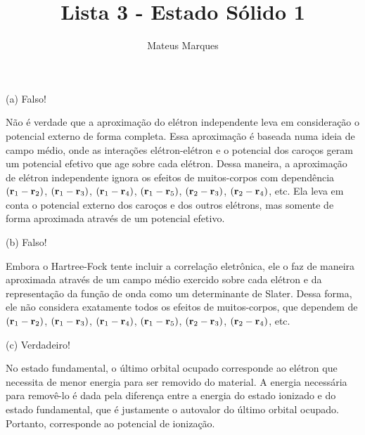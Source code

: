 \documentclass[a4paper,10pt]{article}
\title{\Huge{\textbf{Lista 3 - Estado Sólido 1}}}
\author{Mateus Marques}
\begin{document}
\maketitle

\section{}

(a) Falso!

\n

Não é verdade que a aproximação do elétron independente leva em consideração o potencial externo de forma completa. Essa aproximação é baseada numa ideia de campo médio, onde as interações elétron-elétron e o potencial dos caroços geram um potencial efetivo que age sobre cada elétron. Dessa maneira, a aproximação de elétron independente ignora os efeitos de muitos-corpos com dependência $({\vb{r}}_1 - {\vb{r}}_2)$, $({\vb{r}}_1 - {\vb{r}}_3)$, $({\vb{r}}_1 - {\vb{r}}_4)$,  $({\vb{r}}_1 - {\vb{r}}_5)$, $({\vb{r}}_2 - {\vb{r}}_3)$, $({\vb{r}}_2 - {\vb{r}}_4)$, etc. Ela leva em conta o potencial externo dos caroços e dos outros elétrons, mas somente de forma aproximada através de um potencial efetivo.

\n\n

(b) Falso!

\n

Embora o Hartree-Fock tente incluir a correlação eletrônica, ele o faz de maneira aproximada através de um campo médio exercido sobre cada elétron e da representação da função de onda como um determinante de Slater. Dessa forma, ele não considera exatamente todos os efeitos de muitos-corpos, que dependem de $({\vb{r}}_1 - {\vb{r}}_2)$, $({\vb{r}}_1 - {\vb{r}}_3)$, $({\vb{r}}_1 - {\vb{r}}_4)$,  $({\vb{r}}_1 - {\vb{r}}_5)$, $({\vb{r}}_2 - {\vb{r}}_3)$, $({\vb{r}}_2 - {\vb{r}}_4)$, etc.

\n\n

(c) Verdadeiro!

\n

No estado fundamental, o último orbital ocupado corresponde ao elétron que necessita de menor energia para ser removido do material. A energia necessária para removê-lo é dada pela diferença entre a energia do estado ionizado e do estado fundamental, que é justamente o autovalor do último orbital ocupado. Portanto, corresponde ao potencial de ionização.

\pagebreak

\section{}
\end{document}
